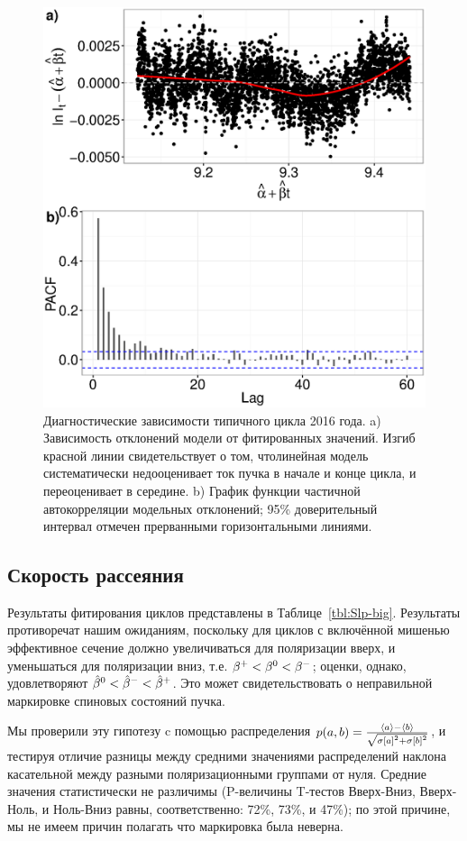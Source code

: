\documentclass{article}
\begin{document}
	\begin{figure}
		\centering
		\includegraphics[scale=.8]{img/DiagPlot_969.eps}
		\caption{Диагностические зависимости типичного цикла 2016 года. a) Зависимость отклонений модели от фитированных значений. Изгиб красной линии свидетельствует о том, чтолинейная модель систематически недооценивает ток пучка в начале и конце цикла,  и переоценивает в середине. b) График функции частичной автокорреляции модельных отклонений; 95\% доверительный интервал отмечен прерванными горизонтальными линиями.\label{fig:Run969}}
	\end{figure}

	\subsection{Скорость рассеяния}
	Результаты фитирования циклов представлены в Таблице~\ref{tbl:Slp-big}. Результаты противоречат нашим ожиданиям, поскольку для циклов с включённой мишенью эффективное сечение должно увеличиваться для поляризации вверх, и уменьшаться для поляризации вниз, т.е. $\slp^+ < \slp^0 < \slp^-$; оценки, однако, удовлетворяют $\slp*^0 < \slp*^- < \slp*^+$. Это может свидетельствовать о неправильной маркировке спиновых состояний пучка. 
	
	Мы проверили эту гипотезу c помощью распределения $p(a,b) = \frac{\avg{a}-\avg{b}}{\sqrt{\SE{a}^2+\SE{b}^2}}$, и тестируя отличие разницы между средними значениями распределений наклона касательной между разными поляризационными группами от нуля. Средние значения статистически не различимы (P-величины T-тестов Вверх-Вниз, Вверх-Ноль, и Ноль-Вниз равны, соответственно: 72\%, 73\%, и 47\%); по этой причине, мы не имеем причин полагать что маркировка была неверна.
	
\end{document}
